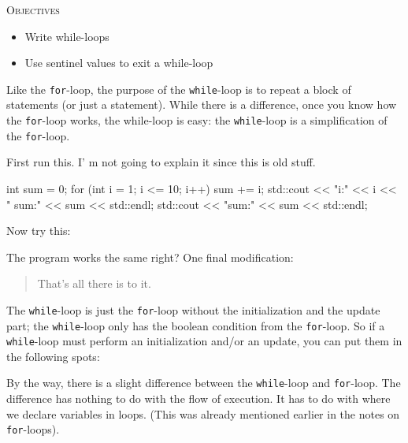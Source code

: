 \newpage{}

\textsc{Objectives}

\begin{itemize}
\item
  Write while-loops
\item
  Use sentinel values to exit a while-loop
\end{itemize}

Like the \texttt{for}-loop, the purpose of the \texttt{while}-loop is to
repeat a block of statements (or just a statement). While there is a
difference, once you know how the \texttt{for}-loop works, the while-loop
is easy: the \texttt{while}-loop is a simplification of the
\texttt{for}-loop.

\newpage{}

First run this. I' m not going to explain it since this
is old stuff.
\begin{console}
int sum = 0;
for (int i = 1; i <= 10; i++)
{   
    sum += i;
    std::cout << "i:" << i << " sum:" << sum
              << std::endl;
}
std::cout << "sum:" << sum << std::endl;
\end{console}
Now try this:
The program works the same right? One final modification:
\begin{quote}
That's all there is to it.
\end{quote}

\begin{quote}
\end{quote}

The \texttt{while}-loop is just the \texttt{for}-loop without the
initialization and the update part; the \texttt{while}-loop only has the
boolean condition from the \texttt{for}-loop. So if a \texttt{while}-loop
must perform an initialization and/or an update, you can put them in the
following spots:
By the way, there is a slight difference between the \texttt{while}-loop
and \texttt{for}-loop. The difference has nothing to do with the flow of
execution. It has to do with where we declare variables in loops. (This
was already mentioned earlier in the notes on \texttt{for}-loops).

